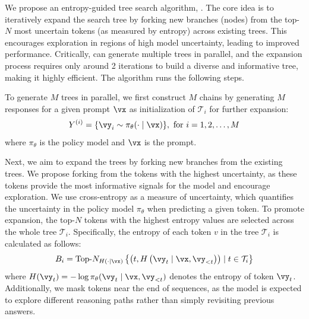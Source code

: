 We propose an entropy-guided tree search algorithm, \treemodel.
The core idea is to iteratively expand the search tree by forking new branches (nodes) from the top-$N$ most uncertain tokens (as measured by entropy) across existing trees.
This encourages exploration in regions of high model uncertainty, leading to improved performance.  
Critically, \treemodel can generate multiple trees in parallel, and the expansion process requires only around 2 iterations to build a diverse and informative tree, making it highly efficient.
The algorithm runs the following steps.

 To generate $M$ trees in parallel, we first construct \( M \) chains by generating $M$ responses for a given prompt \( \vx \) as initialization of $\mathcal{T}_i$ for further expansion:
\[
Y^{(i)} = \{\vy_i \sim \pi_\theta(\cdot \mid \vx)\},~ \text{for} ~ i = 1, 2, \ldots, M
\]
where \( \pi_\theta \) is the policy model and $\vx$ is the prompt. 



 Next, we aim to expand the trees by forking new branches from the existing trees. We propose forking from the tokens with the highest uncertainty, as these tokens provide the most informative signals for the model and encourage exploration.
We use cross-entropy as a measure of uncertainty, which quantifies the uncertainty in the policy model \(\pi_\theta\) when predicting a given token. To promote expansion, the top-\(N\) tokens with the highest entropy values are selected across the whole tree $\mathcal{T}_i$. 
Specifically, the entropy of each token \(v\) in the tree \(\mathcal{T}_i\) is calculated as follows:
\[
B_i = \text{Top-}N_{H(\cdot|\vx)}\left\{\left(t, H\left(\vy_t \mid \vx, \vy_{<t} \right)\right) \mid t \in \mathcal{T}_i\right\}
\]
where \(H(\vy_t) = -\log \pi_{\theta}(\vy_t \mid \vx,\vy_{<t})\) denotes the entropy of token \(\vy_t\). 
Additionally, we mask tokens near the end of sequences, as the model is expected to explore different reasoning paths rather than simply revisiting previous answers.

